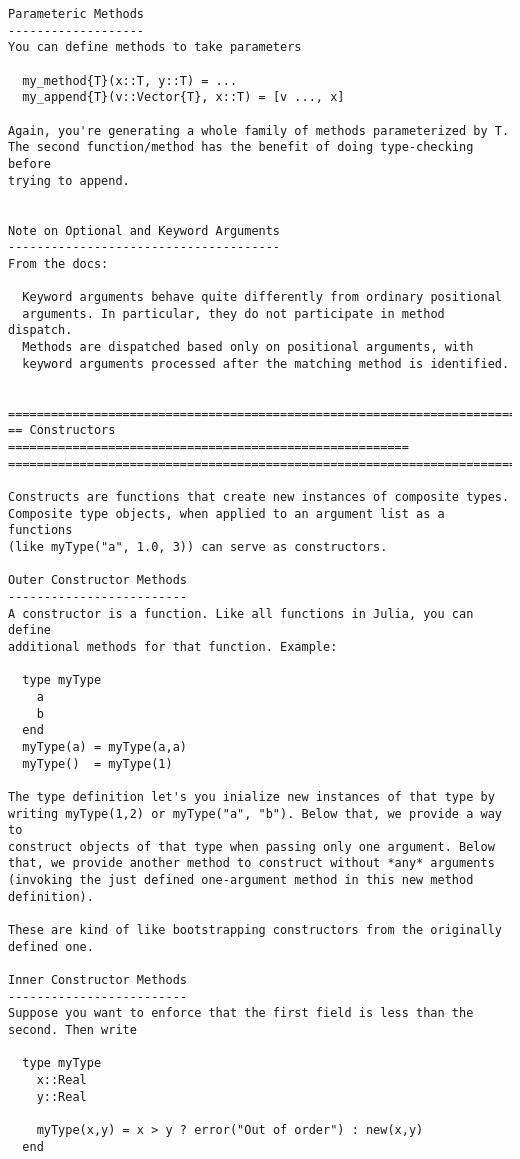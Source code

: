 \documentclass[12pt]{article}
\theoremstyle{plain}
\theoremstyle{definition}
\theoremstyle{remark}
\begin{document}
\begin{lstlisting}
Parameteric Methods
-------------------
You can define methods to take parameters

  my_method{T}(x::T, y::T) = ...
  my_append{T}(v::Vector{T}, x::T) = [v ..., x]

Again, you're generating a whole family of methods parameterized by T.
The second function/method has the benefit of doing type-checking before
trying to append.


Note on Optional and Keyword Arguments
--------------------------------------
From the docs:

  Keyword arguments behave quite differently from ordinary positional
  arguments. In particular, they do not participate in method dispatch.
  Methods are dispatched based only on positional arguments, with
  keyword arguments processed after the matching method is identified.


========================================================================
== Constructors ========================================================
========================================================================

Constructs are functions that create new instances of composite types.
Composite type objects, when applied to an argument list as a functions
(like myType("a", 1.0, 3)) can serve as constructors.

Outer Constructor Methods
-------------------------
A constructor is a function. Like all functions in Julia, you can define
additional methods for that function. Example:

  type myType
    a
    b
  end
  myType(a) = myType(a,a)
  myType()  = myType(1)

The type definition let's you inialize new instances of that type by
writing myType(1,2) or myType("a", "b"). Below that, we provide a way to
construct objects of that type when passing only one argument. Below
that, we provide another method to construct without *any* arguments
(invoking the just defined one-argument method in this new method
definition).

These are kind of like bootstrapping constructors from the originally
defined one.

Inner Constructor Methods
-------------------------
Suppose you want to enforce that the first field is less than the
second. Then write

  type myType
    x::Real
    y::Real

    myType(x,y) = x > y ? error("Out of order") : new(x,y)
  end


\end{lstlisting}
\end{document}
